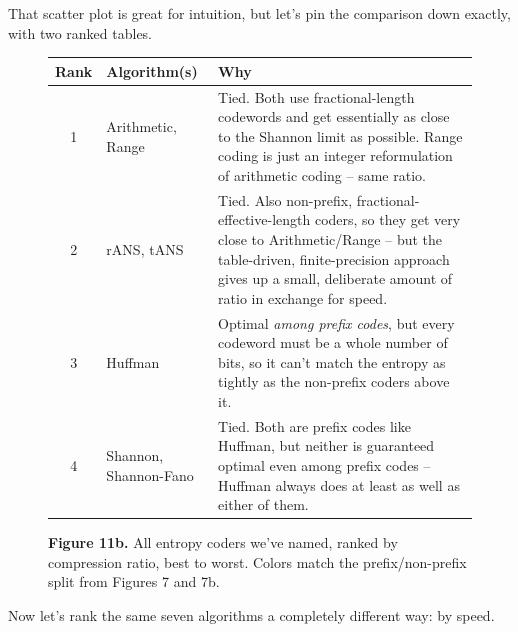 \documentclass[11pt]{article}
\begin{document}
That scatter plot is great for intuition, but let's pin the comparison down
exactly, with two ranked tables.

\begin{figure}[H]
\centering
\begin{tabular}{@{}cp{4.0cm}p{6.0cm}@{}}
\toprule
\textbf{Rank} & \textbf{Algorithm(s)} & \textbf{Why} \\
\midrule
1 & \textcolor{nonprefixcol}{Arithmetic}, \textcolor{nonprefixcol}{Range} &
Tied. Both use fractional-length codewords and get essentially as close to
the Shannon limit as possible. Range coding is just an integer
reformulation of arithmetic coding -- same ratio. \\[4pt]
2 & \textcolor{nonprefixcol}{rANS}, \textcolor{bestcol}{tANS} &
Tied. Also non-prefix, fractional-effective-length coders, so they get very
close to Arithmetic/Range -- but the table-driven, finite-precision approach
gives up a small, deliberate amount of ratio in exchange for speed. \\[4pt]
3 & \textcolor{prefixcol}{Huffman} &
Optimal \emph{among prefix codes}, but every codeword must be a whole number
of bits, so it can't match the entropy as tightly as the non-prefix coders
above it. \\[4pt]
4 & \textcolor{prefixcol}{Shannon}, \textcolor{prefixcol}{Shannon-Fano} &
Tied. Both are prefix codes like Huffman, but neither is guaranteed optimal
even among prefix codes -- Huffman always does at least as well as either of
them. \\
\bottomrule
\end{tabular}
\caption*{\textbf{Figure 11b.} All entropy coders we've named, ranked by
compression ratio, best to worst. Colors match the prefix/non-prefix split
from Figures 7 and 7b.}
\end{figure}

Now let's rank the same seven algorithms a completely different way: by speed.
\end{document}
